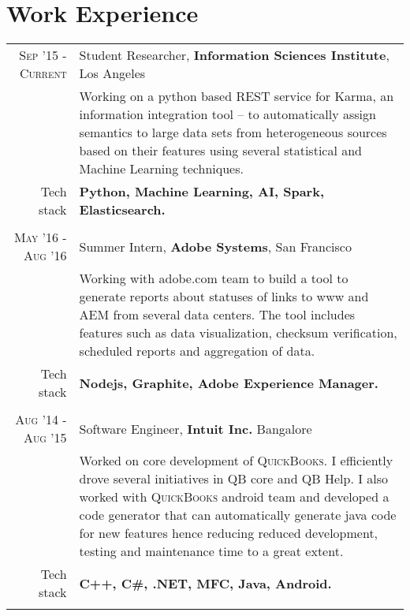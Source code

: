 \section{Work Experience}
\renewcommand{\arraystretch}{0.85}%
\begin{tabular}{r|p{13cm}}

\textsc{Sep '15 - Current} & Student Researcher, \textbf{Information Sciences Institute}, Los Angeles \\
& \small{Working on a python based REST service for Karma, an information integration tool – to automatically assign semantics to large data sets from heterogeneous sources based on their features using several statistical and Machine Learning techniques.}\\
\small{Tech stack} &\footnotesize{\textbf{Python, Machine Learning, AI, Spark, Elasticsearch.}} \\
\multicolumn{2}{c}{} \\

\textsc{May '16 - Aug '16} & Summer Intern, \textbf{Adobe Systems}, San Francisco \\
& \small{Working with adobe.com team to build a tool to generate reports about statuses of links to www and AEM from several data centers. The tool includes features such as data visualization, checksum verification, scheduled reports and aggregation of data.}\\
\small{Tech stack} &\footnotesize{\textbf{Nodejs, Graphite, Adobe Experience Manager.}} \\
\multicolumn{2}{c}{} \\

\textsc{Aug '14 - Aug '15 } & Software Engineer, \textbf{Intuit Inc.} Bangalore \\
& \small{Worked on core development of \textsc{QuickBooks}. I efficiently drove several initiatives in QB core and QB Help. I also worked with \textsc{QuickBooks} android team and developed a code generator that can automatically generate java code for new features hence reducing reduced development, testing and maintenance time to a great extent.}\\
\small{Tech stack} &\footnotesize{\textbf{C++, C\#, .NET, MFC, Java, Android.}} \\
\multicolumn{2}{c}{}



\end{tabular}
